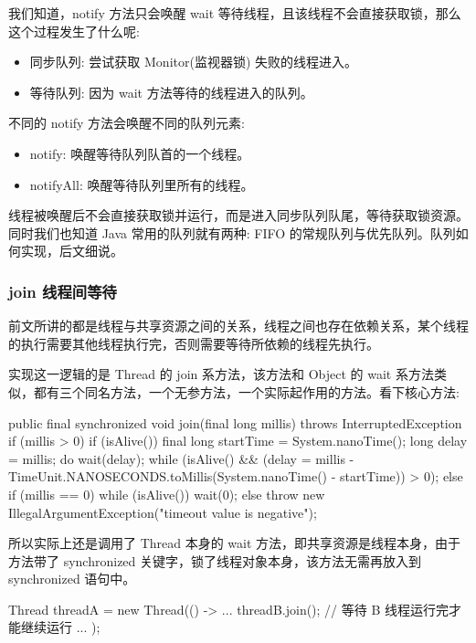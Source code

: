 我们知道，notify 方法只会唤醒 wait 等待线程，且该线程不会直接获取锁，那么这个过程发生了什么呢:

\begin{itemize}
    \item 同步队列: 尝试获取 Monitor(监视器锁) 失败的线程进入。
    \item 等待队列: 因为 wait 方法等待的线程进入的队列。
\end{itemize}

不同的 notify 方法会唤醒不同的队列元素:
\begin{itemize}
    \item notify: 唤醒等待队列队首的一个线程。
    \item notifyAll: 唤醒等待队列里所有的线程。
\end{itemize}

线程被唤醒后不会直接获取锁并运行，而是进入同步队列队尾，等待获取锁资源。同时我们也知道 Java 常用的队列就有两种: FIFO 的常规队列与优先队列。队列如何实现，后文细说。

\subsubsection{join 线程间等待}

前文所讲的都是线程与共享资源之间的关系，线程之间也存在依赖关系，某个线程的执行需要其他线程执行完，否则需要等待所依赖的线程先执行。

实现这一逻辑的是 Thread 的 join 系方法，该方法和 Object 的 wait 系方法类似，都有三个同名方法，一个无参方法，一个实际起作用的方法。看下核心方法:

\begin{Java}
public final synchronized void join(final long millis) throws InterruptedException {
    if (millis > 0) {
        if (isAlive()) {
            final long startTime = System.nanoTime();
            long delay = millis;
            do {
                wait(delay);
            } while (isAlive() && (delay = millis - TimeUnit.NANOSECONDS.toMillis(System.nanoTime() - startTime)) > 0);
        }
    } else if (millis == 0) {
        while (isAlive()) {
            wait(0);
        }
    } else {
        throw new IllegalArgumentException("timeout value is negative");
    }
}
\end{Java}

所以实际上还是调用了 Thread 本身的 wait 方法，即共享资源是线程本身，由于方法带了 synchronized 关键字，锁了线程对象本身，该方法无需再放入到 synchronized 语句中。

\begin{Java}
Thread threadA = new Thread(() -> {
    ...
    threadB.join(); // 等待 B 线程运行完才能继续运行
    ...
});
\end{Java}

